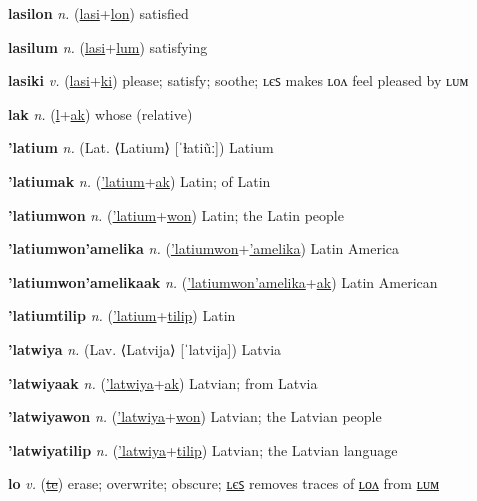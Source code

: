 \textbf{\hypertarget{lasilon}{lasilon}} \textit{n.} (\hyperlink{lasi}{lasi}+\allowbreak \hyperlink{lon}{lon})
satisfied

\textbf{\hypertarget{lasilum}{lasilum}} \textit{n.} (\hyperlink{lasi}{lasi}+\allowbreak \hyperlink{lum}{lum})
satisfying

\textbf{\hypertarget{lasiki}{lasiki}} \textit{v.} (\hyperlink{lasi}{lasi}+\allowbreak \hyperlink{ki}{ki})
please; satisfy; soothe; ʟєꜱ makes ʟᴏᴧ feel pleased by ʟᴜᴍ

\textbf{\hypertarget{lak}{lak}} \textit{n.} (\hyperlink{l}{l}+\allowbreak \hyperlink{ak}{ak})
whose (relative)

\textbf{\hypertarget{'latium}{'latium}} \textit{n.} (Lat. ⟨Latium⟩ [ˈɫatiũː])
Latium

\textbf{\hypertarget{'latiumak}{'latiumak}} \textit{n.} (\hyperlink{'latium}{'latium}+\allowbreak \hyperlink{ak}{ak})
Latin; of Latin

\textbf{\hypertarget{'latiumwon}{'latiumwon}} \textit{n.} (\hyperlink{'latium}{'latium}+\allowbreak \hyperlink{won}{won})
Latin; the Latin people

\textbf{\hypertarget{'latiumwon'amelika}{'latiumwon'amelika}} \textit{n.} (\hyperlink{'latiumwon}{'latiumwon}+\allowbreak \hyperlink{'amelika}{'amelika})
Latin America

\textbf{\hypertarget{'latiumwon'amelikaak}{'latiumwon'amelikaak}} \textit{n.} (\hyperlink{'latiumwon'amelika}{'latiumwon'amelika}+\allowbreak \hyperlink{ak}{ak})
Latin American

\textbf{\hypertarget{'latiumtilip}{'latiumtilip}} \textit{n.} (\hyperlink{'latium}{'latium}+\allowbreak \hyperlink{tilip}{tilip})
Latin

\textbf{\hypertarget{'latwiya}{'latwiya}} \textit{n.} (Lav. ⟨Latvija⟩ [ˈlatvija])
Latvia

\textbf{\hypertarget{'latwiyaak}{'latwiyaak}} \textit{n.} (\hyperlink{'latwiya}{'latwiya}+\allowbreak \hyperlink{ak}{ak})
Latvian; from Latvia

\textbf{\hypertarget{'latwiyawon}{'latwiyawon}} \textit{n.} (\hyperlink{'latwiya}{'latwiya}+\allowbreak \hyperlink{won}{won})
Latvian; the Latvian people

\textbf{\hypertarget{'latwiyatilip}{'latwiyatilip}} \textit{n.} (\hyperlink{'latwiya}{'latwiya}+\allowbreak \hyperlink{tilip}{tilip})
Latvian; the Latvian language

\textbf{\hypertarget{lo}{lo}} \textit{v.} (\hyperlink{te}{\sout{te}})
erase; overwrite; obscure; \hyperlink{loles}{ʟєꜱ} removes traces of \hyperlink{lolon}{ʟᴏᴧ} from \hyperlink{lolum}{ʟᴜᴍ}


